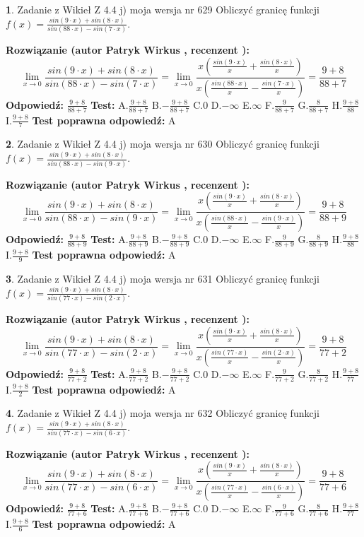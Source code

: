 \documentclass[12pt, a4paper]{article}
\theoremstyle{definition} %
\newtheorem{zad}{}
\newcommand{\zadStart}[1]{\begin{zad}#1\newline}
\newcommand{\zadStop}{\end{zad}}
\newcommand{\rozwStart}[2]{\noindent \textbf{Rozwiązanie (autor #1 , recenzent #2): }\newline}
\newcommand{\rozwStop}{\newline}
\newcommand{\odpStart}{\noindent \textbf{Odpowiedź:}\newline}
\newcommand{\odpStop}{\newline}
\newcommand{\testStart}{\noindent \textbf{Test:}\newline}
\newcommand{\testStop}{\newline}
\newcommand{\kluczStart}{\noindent \textbf{Test poprawna odpowiedź:}\newline}
\newcommand{\kluczStop}{\newline}
\begin{document}
\zadStart{Zadanie z Wikieł Z 4.4 j) moja wersja nr 629}
Obliczyć granicę funkcji $f(x)=\frac{sin(9\cdot x) +sin(8\cdot x)}{sin(88\cdot x) -sin(7\cdot x)}$.
\zadStop
\rozwStart{Patryk Wirkus}{}
$$\lim\limits_{x\to 0}\frac{sin(9\cdot x) +sin(8\cdot x)}{sin(88\cdot x) -sin(7\cdot x)}=\lim\limits_{x\to 0}\frac{x(\frac{sin(9\cdot x)}{x}+\frac{sin(8\cdot x)}{x})}{x(\frac{sin(88\cdot x)}{x}-\frac{sin(7\cdot x)}{x})}=\frac{9+8}{88+7}$$
\rozwStop
\odpStart
$\frac{9+8}{88+7}$
\odpStop
\testStart
A.$\frac{9+8}{88+7}$
B.$-\frac{9+8}{88+7}$
C.$0$
D.$-\infty$
E.$\infty$
F.$\frac{9}{88+7}$
G.$\frac{8}{88+7}$
H.$\frac{9+8}{88}$
I.$\frac{9+8}{7}$
\testStop
\kluczStart
A
\kluczStop



\zadStart{Zadanie z Wikieł Z 4.4 j) moja wersja nr 630}
Obliczyć granicę funkcji $f(x)=\frac{sin(9\cdot x) +sin(8\cdot x)}{sin(88\cdot x) -sin(9\cdot x)}$.
\zadStop
\rozwStart{Patryk Wirkus}{}
$$\lim\limits_{x\to 0}\frac{sin(9\cdot x) +sin(8\cdot x)}{sin(88\cdot x) -sin(9\cdot x)}=\lim\limits_{x\to 0}\frac{x(\frac{sin(9\cdot x)}{x}+\frac{sin(8\cdot x)}{x})}{x(\frac{sin(88\cdot x)}{x}-\frac{sin(9\cdot x)}{x})}=\frac{9+8}{88+9}$$
\rozwStop
\odpStart
$\frac{9+8}{88+9}$
\odpStop
\testStart
A.$\frac{9+8}{88+9}$
B.$-\frac{9+8}{88+9}$
C.$0$
D.$-\infty$
E.$\infty$
F.$\frac{9}{88+9}$
G.$\frac{8}{88+9}$
H.$\frac{9+8}{88}$
I.$\frac{9+8}{9}$
\testStop
\kluczStart
A
\kluczStop



\zadStart{Zadanie z Wikieł Z 4.4 j) moja wersja nr 631}
Obliczyć granicę funkcji $f(x)=\frac{sin(9\cdot x) +sin(8\cdot x)}{sin(77\cdot x) -sin(2\cdot x)}$.
\zadStop
\rozwStart{Patryk Wirkus}{}
$$\lim\limits_{x\to 0}\frac{sin(9\cdot x) +sin(8\cdot x)}{sin(77\cdot x) -sin(2\cdot x)}=\lim\limits_{x\to 0}\frac{x(\frac{sin(9\cdot x)}{x}+\frac{sin(8\cdot x)}{x})}{x(\frac{sin(77\cdot x)}{x}-\frac{sin(2\cdot x)}{x})}=\frac{9+8}{77+2}$$
\rozwStop
\odpStart
$\frac{9+8}{77+2}$
\odpStop
\testStart
A.$\frac{9+8}{77+2}$
B.$-\frac{9+8}{77+2}$
C.$0$
D.$-\infty$
E.$\infty$
F.$\frac{9}{77+2}$
G.$\frac{8}{77+2}$
H.$\frac{9+8}{77}$
I.$\frac{9+8}{2}$
\testStop
\kluczStart
A
\kluczStop



\zadStart{Zadanie z Wikieł Z 4.4 j) moja wersja nr 632}
Obliczyć granicę funkcji $f(x)=\frac{sin(9\cdot x) +sin(8\cdot x)}{sin(77\cdot x) -sin(6\cdot x)}$.
\zadStop
\rozwStart{Patryk Wirkus}{}
$$\lim\limits_{x\to 0}\frac{sin(9\cdot x) +sin(8\cdot x)}{sin(77\cdot x) -sin(6\cdot x)}=\lim\limits_{x\to 0}\frac{x(\frac{sin(9\cdot x)}{x}+\frac{sin(8\cdot x)}{x})}{x(\frac{sin(77\cdot x)}{x}-\frac{sin(6\cdot x)}{x})}=\frac{9+8}{77+6}$$
\rozwStop
\odpStart
$\frac{9+8}{77+6}$
\odpStop
\testStart
A.$\frac{9+8}{77+6}$
B.$-\frac{9+8}{77+6}$
C.$0$
D.$-\infty$
E.$\infty$
F.$\frac{9}{77+6}$
G.$\frac{8}{77+6}$
H.$\frac{9+8}{77}$
I.$\frac{9+8}{6}$
\testStop
\kluczStart
A
\kluczStop
\end{document}
